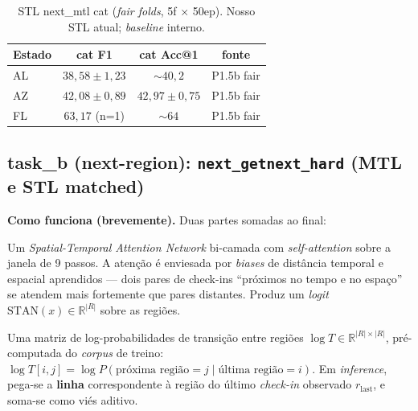 \documentclass[11pt,a4paper]{article}
\begin{document}
\begin{table}[H]
\centering
\small
\caption{STL next\_mtl cat (\textit{fair folds}, 5f $\times$ 50ep). Nosso STL atual; \textit{baseline} interno.}
\begin{tabular}{lccc}
\toprule
\textbf{Estado} & \textbf{cat F1} & \textbf{cat Acc@1} & \textbf{fonte} \\
\midrule
AL & $38{,}58 \pm 1{,}23$ & $\sim 40{,}2$ & P1.5b fair \\
AZ & $42{,}08 \pm 0{,}89$ & $42{,}97 \pm 0{,}75$ & P1.5b fair \\
FL & $63{,}17$ (n=1) & $\sim 64$ & P1.5b fair \\
\bottomrule
\end{tabular}
\end{table}

\subsection{task\_b (next-region): \texttt{next\_getnext\_hard} (MTL e STL matched)}

\noindent\textbf{Como funciona (brevemente).} Duas partes somadas ao final:

\begin{description}[leftmargin=1em,style=nextline,topsep=0pt,itemsep=2pt]
\item[\textbf{STAN} (Luo, WWW 2021, \textit{backbone neural}).] Um \textit{Spatial-Temporal Attention Network} bi-camada com \textit{self-attention} sobre a janela de 9 passos. A atenção é enviesada por \textit{biases} de distância temporal e espacial aprendidos --- dois pares de check-ins ``próximos no tempo e no espaço'' se atendem mais fortemente que pares distantes. Produz um \textit{logit} $\text{STAN}(x) \in \mathbb{R}^{|R|}$ sobre as regiões.
\item[\textbf{\textit{Graph prior}} (GETNext, Yang et al.\ SIGIR 2022).] Uma matriz de log-probabilidades de transição entre regiões $\log T \in \mathbb{R}^{|R|\times|R|}$, pré-computada do \textit{corpus} de treino: $\log T[i,j] = \log P(\text{próxima região} = j \mid \text{última região} = i)$. Em \textit{inference}, pega-se a \textbf{linha} correspondente à região do último \textit{check-in} observado $r_\text{last}$, e soma-se como viés aditivo.
\end{description}
\end{document}

